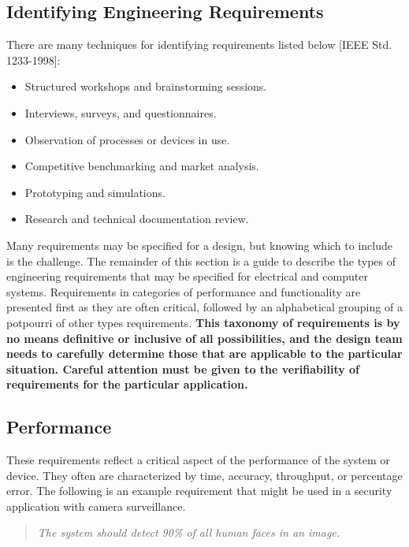 \subsection{Identifying Engineering Requirements}
\label{section:identifying-engineering-requirements}

There are many techniques for identifying requirements listed below
{[}IEEE Std. 1233-1998{]}:

\begin{itemize}
\item
  Structured workshops and brainstorming sessions.
\item
  Interviews, surveys, and questionnaires.
\item
  Observation of processes or devices in use.
\item
  Competitive benchmarking and market analysis.
\item
  Prototyping and simulations.
\item
  Research and technical documentation review.
\end{itemize}

Many requirements may be specified for a design, but knowing which to
include is the challenge. The remainder of this section is a guide to
describe the types of engineering requirements that may be specified for
electrical and computer systems. Requirements in categories of
performance and functionality are presented first as they are often
critical, followed by an alphabetical grouping of a potpourri of other
types requirements. \textbf{This taxonomy of requirements is by no means
definitive or inclusive of all possibilities, and the design team needs
to carefully determine those that are applicable to the particular
situation. Careful attention must be given to the verifiability of
requirements for the particular application.}

\subsection*{Performance}
\label{section:performance}

These requirements reflect a critical aspect of the performance of the
system or device. They often are characterized by time, accuracy,
throughput, or percentage error. The following is an example requirement
that might be used in a security application with camera surveillance.

\begin{quote}
\emph{The system should detect 90\% of all human faces in an image.}
\end{quote}

